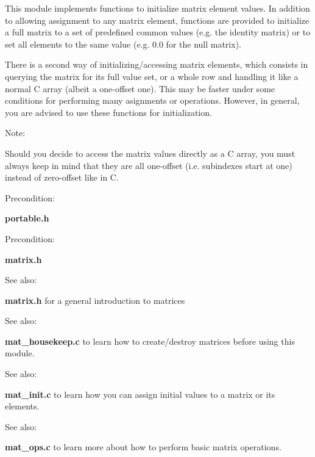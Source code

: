 This module implements functions to initialize matrix element values. In addition to allowing assignment to any matrix element, functions are provided to initialize a full matrix to a set of predefined common values (e.g. the identity matrix) or to set all elements to the same value (e.g. 0.0 for the null matrix).

There is a second way of initializing/accessing matrix elements, which consists in querying the matrix for its full value set, or a whole row and handling it like a normal C array (albeit a one-offset one). This may be faster under some conditions for performing many asignments or operations. However, in general, you are advised to use these functions for initialization.

\begin{Desc}
\item[Note: ]\par
Should you decide to access the matrix values directly as a C array, you must always keep in mind that they are all one-offset (i.e. subindexes start at one) instead of zero-offset like in C.\end{Desc}
\begin{Desc}
\item[Precondition: ]\par
{\bf portable.h}\end{Desc}
\begin{Desc}
\item[Precondition: ]\par
{\bf matrix.h}\end{Desc}
\begin{Desc}
\item[See also: ]\par
{\bf matrix.h} for a general introduction to matrices\end{Desc}
\begin{Desc}
\item[See also: ]\par
{\bf mat\_\-housekeep.c} to learn how to create/destroy matrices before using this module.\end{Desc}
\begin{Desc}
\item[See also: ]\par
{\bf mat\_\-init.c} to learn how you can assign initial values to a matrix or its elements.\end{Desc}
\begin{Desc}
\item[See also: ]\par
{\bf mat\_\-ops.c} to learn more about how to perform basic matrix operations.\end{Desc}
